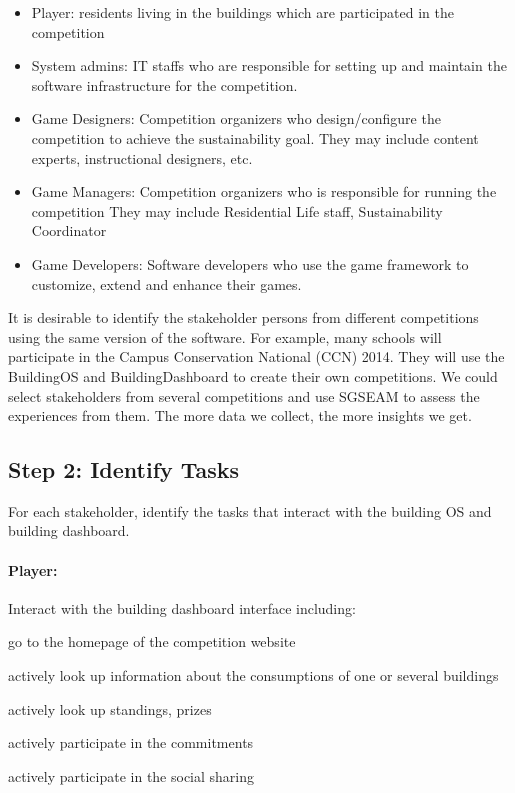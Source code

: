 \begin{itemize}
\item Player:
    residents living in the buildings which are participated in the competition

\item System admins:
    IT staffs who are responsible for setting up and maintain the software infrastructure for the competition.
    
\item Game Designers:
    Competition organizers who design/configure the competition to achieve the sustainability goal.
    They may include content experts, instructional designers, etc.

\item Game Managers:
    Competition organizers who is responsible for running the competition
    They may include Residential Life staff, Sustainability Coordinator

\item Game Developers:
    Software developers who use the game framework to customize, extend and enhance their games.    
\end{itemize}

It is desirable to identify the stakeholder persons from different competitions using the same version of the software. For example, many schools will participate in the Campus Conservation National (CCN) 2014. They will use the BuildingOS and BuildingDashboard to create their own competitions. We could select stakeholders from several competitions and use SGSEAM to assess the experiences from them. The more data we collect, the more insights we get.

\subsection{Step 2: Identify Tasks} 
For each stakeholder, identify the tasks that interact with the building OS and building dashboard.

\paragraph{Player:} Interact with the building dashboard interface including:
    \begin{compactitem}
    \item go to the homepage of the competition website
    \item actively look up information about the consumptions of one or several buildings
    \item actively look up standings, prizes
    \item actively participate in the commitments
    \item actively participate in the social sharing
    \end{compactitem}

